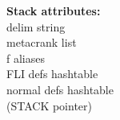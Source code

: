 \documentclass[12 pt]{article}%
\begin{document}
\textbf{Stack attributes:} \\
\medskip
delim string \\
metacrank list \\
f aliases \\
FLI defs hashtable \\
normal defs hashtable \\
(STACK pointer)
\end{document}
